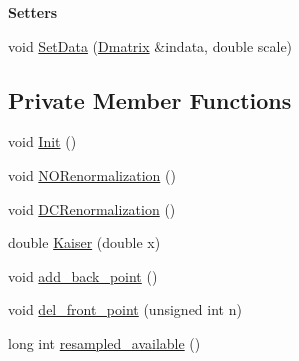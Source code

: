 \begin{Indent}\textbf{ Setters}\par
\begin{DoxyCompactItemize}
\item 
void \hyperlink{classtsa_1_1_b_l_interpolation_ac8a67161f8c0aeb39ced9d36664860ba}{Set\+Data} (\hyperlink{namespacetsa_ad260cd21c1891c4ed391fe788569aba4}{Dmatrix} \&indata, double scale)
\end{DoxyCompactItemize}
\end{Indent}
\subsection*{Private Member Functions}
\begin{DoxyCompactItemize}
\item 
void \hyperlink{classtsa_1_1_b_l_interpolation_aff26a1c884d2733cebf280a556987e51}{Init} ()
\item 
void \hyperlink{classtsa_1_1_b_l_interpolation_a7b429b2867b887e3fec9d44c584f026c}{N\+O\+Renormalization} ()
\item 
void \hyperlink{classtsa_1_1_b_l_interpolation_a5d7f3b437e0aa09df7831c2b72a39f62}{D\+C\+Renormalization} ()
\item 
double \hyperlink{classtsa_1_1_b_l_interpolation_a8eeac8a3a0439f46764cf1455bd2febe}{Kaiser} (double x)
\item 
void \hyperlink{classtsa_1_1_b_l_interpolation_a23d1958ad6c23572e21c39ad421bf2a2}{add\+\_\+back\+\_\+point} ()
\item 
void \hyperlink{classtsa_1_1_b_l_interpolation_ac9f1957097458403fd2919445d3323db}{del\+\_\+front\+\_\+point} (unsigned int n)
\item 
long int \hyperlink{classtsa_1_1_b_l_interpolation_adfb54e2b5bd52c05c3caaf062f97d9b6}{resampled\+\_\+available} ()
\end{DoxyCompactItemize}
